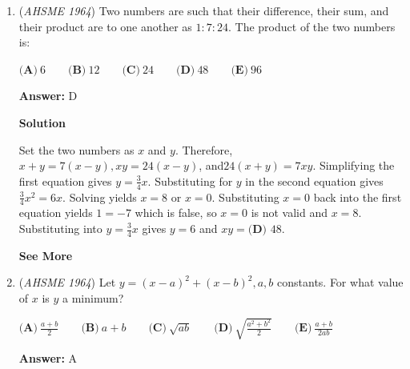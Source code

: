 \begin{enumerate}
 



\textbf{Solution 2}


 \begin{align*} \frac{A_{DFE}}{A_{ADE}} &= \frac{\frac{1}{3}DA}{DA} = \frac{1}{3} \\ A_{DFE} &= \frac{1}{3}A_{ADE} \\ A_{ADE} &= \frac{1}{2}A_{ADB} = \frac{1}{4}A_{ABCD} \\ \implies A_{DFE} &= \frac{1}{3} \cdot \frac{1}{4} A_{ABCD} = \frac{1}{12} A_{ABCD} \\ A_{ABEF} &= A_{ABD} - A_{DFE} \\ &= \frac{1}{2}A_{ABCD} - \frac{1}{12}A_{ABCD} \\ &= \frac{5}{12}A_{ABCD} \end{align*}
Therefore, $\frac{A_{DFE}}{A_{ABEF}} = \frac{\frac{1}{12}}{\frac{5}{12}} = \frac{1}{5}$, giving us the answer $\boxed{\textbf{(C)}}$. -nullptr07

 


	\item (\textit{AHSME 1964}) Two numbers are such that their difference, their sum, and their product are to one another as $1:7:24$. The product of the two numbers is:


 $\textbf{(A)}\ 6\qquad \textbf{(B)}\ 12\qquad \textbf{(C)}\ 24\qquad \textbf{(D)}\ 48\qquad \textbf{(E)}\ 96$

 \textbf{Answer: }D



\textbf{Solution}

Set the two numbers as $x$ and $y$. Therefore, $x+y=7(x-y),  xy=24(x-y)$, and$24(x+y)=7xy$. Simplifying the first equation gives $y=\frac{3}{4}x$. Substituting for $y$ in the second equation gives $\frac{3}{4}x^2=6x.$ Solving yields $x=8$ or $x=0$. Substituting $x=0$ back into the first equation yields $1=-7$ which is false, so $x=0$ is not valid and $x=8$. Substituting into $y=\frac{3}{4}x$ gives $y=6$ and $xy=\boxed{\textbf{(D) } 48}$.

 \textbf{See More} 


	\item (\textit{AHSME 1964}) Let $y=(x-a)^2+(x-b)^2, a, b$ constants. For what value of $x$ is $y$ a minimum?


 $\textbf{(A)}\ \frac{a+b}{2} \qquad \textbf{(B)}\ a+b \qquad \textbf{(C)}\ \sqrt{ab} \qquad \textbf{(D)}\ \sqrt{\frac{a^2+b^2}{2}}\qquad \textbf{(E)}\ \frac{a+b}{2ab}$

 \textbf{Answer: }A




\end{enumerate}
